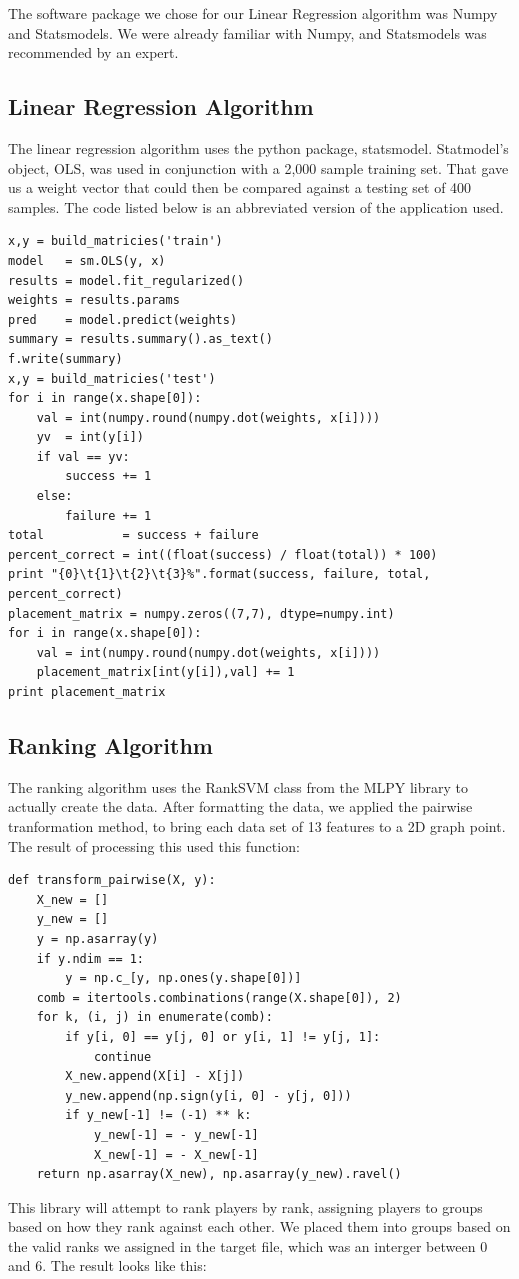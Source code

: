 \documentclass{article} %
\begin{document}
The software package we chose for our Linear Regression algorithm was Numpy and Statsmodels. We were already familiar with Numpy, and Statsmodels was recommended by an expert.



\subsection{Linear Regression Algorithm}
The linear regression algorithm uses the python package, statsmodel. Statmodel's object, OLS, was used in conjunction with a 2,000 sample training set. That gave us a weight vector that could then be compared against a testing set of 400 samples. The code listed below is an abbreviated version of the application used.
\begin{lstlisting}
x,y = build_matricies('train')
model   = sm.OLS(y, x)
results = model.fit_regularized()
weights = results.params
pred    = model.predict(weights)
summary = results.summary().as_text()
f.write(summary)
x,y = build_matricies('test')
for i in range(x.shape[0]):
	val = int(numpy.round(numpy.dot(weights, x[i])))
	yv  = int(y[i])
	if val == yv:
		success += 1
	else:
		failure += 1
total           = success + failure
percent_correct = int((float(success) / float(total)) * 100)
print "{0}\t{1}\t{2}\t{3}%".format(success, failure, total, percent_correct)
placement_matrix = numpy.zeros((7,7), dtype=numpy.int)
for i in range(x.shape[0]):
	val = int(numpy.round(numpy.dot(weights, x[i])))
	placement_matrix[int(y[i]),val] += 1
print placement_matrix
\end{lstlisting}


\subsection{Ranking Algorithm}
The ranking algorithm uses the RankSVM class from the MLPY library \cite{mlpy} to actually create the data. After formatting the data, we applied the pairwise tranformation method, to bring each data set of 13 features to a 2D graph point. The result of processing this used this function:\\
\begin{lstlisting}
def transform_pairwise(X, y):
    X_new = []
    y_new = []
    y = np.asarray(y)
    if y.ndim == 1:
        y = np.c_[y, np.ones(y.shape[0])]
    comb = itertools.combinations(range(X.shape[0]), 2)
    for k, (i, j) in enumerate(comb):
        if y[i, 0] == y[j, 0] or y[i, 1] != y[j, 1]:
            continue
        X_new.append(X[i] - X[j])
        y_new.append(np.sign(y[i, 0] - y[j, 0]))
        if y_new[-1] != (-1) ** k:
            y_new[-1] = - y_new[-1]
            X_new[-1] = - X_new[-1]
    return np.asarray(X_new), np.asarray(y_new).ravel()
\end{lstlisting}
This library will attempt to rank players by rank, assigning players to groups based on how they rank against each other. We placed them into groups based on the valid ranks we assigned in the target file, which was an interger between 0 and 6. The result looks like this:\\
\end{document}
